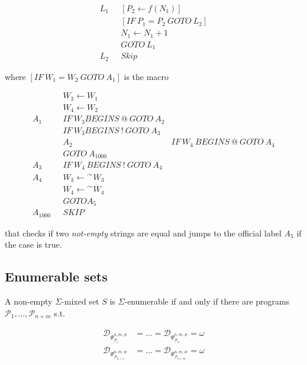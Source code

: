 \documentclass[a4paper, 12pt]{article}
\begin{document}
\begin{align*}
    L_1~ ~ ~&\left[P_2 \leftarrow f(N_1) \right]  \\ 
    &\left[ IF ~ P_1 = P_2 ~ GOTO ~ L_2 \right]  \\ 
    &N_1 \leftarrow N_1 + 1 \\ 
    &GOTO ~ L_1 \\ 
    L_2 ~ ~ ~ & Skip
\end{align*}

where $\left[ IF ~ W_1 = W_2 ~ GOTO ~ A_1 \right] $ is the macro

\begin{align*}
    &W_3 \leftarrow W_1  \\ 
    &W_4 \leftarrow W_2 \\ 
    A_1 ~ ~ ~ &IF ~ W_3 BEGINS ~ @ ~ GOTO ~ A_2 \\ 
    &IF ~ W_3 BEGINS ~ ! ~ GOTO ~ A_3 \\ 
    &
    A_2 ~ ~ ~ &IF~ W_4 ~ BEGINS ~ @ ~ GOTO ~ A_4 \\ 
              &GOTO ~ A_{1000}\\
    A_3 ~ ~ ~ &IF~ W_4 ~ BEGINS ~ ! ~ GOTO ~ A_4 \\ 
    A_4 ~ ~ ~ & W_3 \leftarrow {}^{\curvearrowright} W_3 \\ 
              &W_4 \leftarrow {}^{\curvearrowright} W_4 \\ 
              &GOTO A_5 \\ 
    A_{1000}~ ~ ~ & SKIP
\end{align*}

that checks if two \textit{not-empty} strings are equal and jumps to the
official label $A_5$ if the case is true.

\subsection{Enumerable sets}

A non-empty $\Sigma$-mixed set $S$ is $\Sigma$-enumerable if and only if there are
programs $\mathcal{P}_1, \ldots, \mathcal{P}_{n + m}$ s.t. 

\begin{align*}
    \mathcal{D}_{\Psi_{\mathcal{P}_1}^{n, m, \#}} &= \ldots =
    \mathcal{D}_{\Psi_{\mathcal{P}_n}^{n, m, \#}} = \omega\\
    \mathcal{D}_{\Psi_{\mathcal{P}_{n+1}}^{n, m, \#}} &= \ldots =
    \mathcal{D}_{\Psi_{\mathcal{P}_{n+m}}^{n, m, \#}} = \omega
\end{align*}
\end{document}
